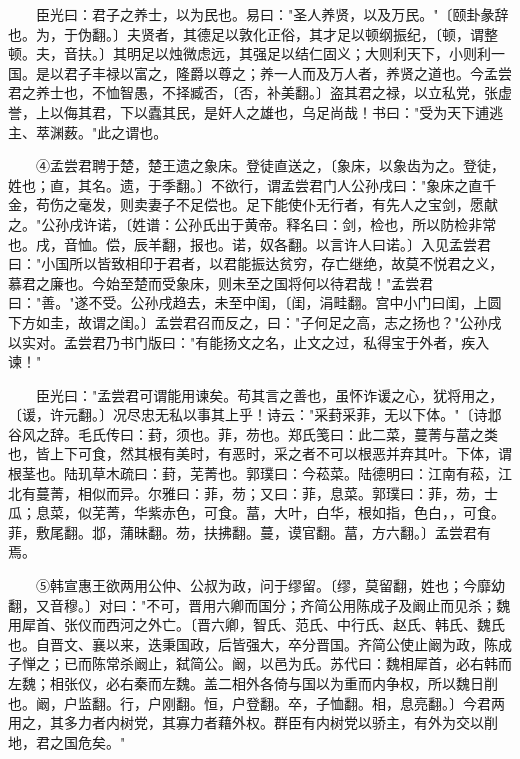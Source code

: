 　　臣光曰：君子之养士，以为民也。易曰："圣人养贤，以及万民。"〔颐卦彖辞也。为，于伪翻。〕夫贤者，其德足以敦化正俗，其才足以顿纲振纪，〔顿，谓整顿。夫，音扶。〕其明足以烛微虑远，其强足以结仁固义；大则利天下，小则利一国。是以君子丰禄以富之，隆爵以尊之；养一人而及万人者，养贤之道也。今孟尝君之养士也，不恤智愚，不择臧否，〔否，补美翻。〕盗其君之禄，以立私党，张虚誉，上以侮其君，下以蠹其民，是奸人之雄也，乌足尚哉！书曰："受为天下逋逃主、萃渊薮。"此之谓也。

　　④孟尝君聘于楚，楚王遗之象床。登徒直送之，〔象床，以象齿为之。登徒，姓也；直，其名。遗，于季翻。〕不欲行，谓孟尝君门人公孙戌曰："象床之直千金，苟伤之毫发，则卖妻子不足偿也。足下能使仆无行者，有先人之宝剑，愿献之。"公孙戌许诺，〔姓谱：公孙氏出于黄帝。释名曰：剑，检也，所以防检非常也。戌，音恤。偿，辰羊翻，报也。诺，奴各翻。以言许人曰诺。〕入见孟尝君曰："小国所以皆致相印于君者，以君能振达贫穷，存亡继绝，故莫不悦君之义，慕君之廉也。今始至楚而受象床，则未至之国将何以待君哉！"孟尝君曰："善。"遂不受。公孙戌趋去，未至中闺，〔闺，涓畦翻。宫中小门曰闺，上圆下方如圭，故谓之闺。〕孟尝君召而反之，曰："子何足之高，志之扬也？"公孙戌以实对。孟尝君乃书门版曰："有能扬文之名，止文之过，私得宝于外者，疾入谏！"

　　臣光曰："孟尝君可谓能用谏矣。苟其言之善也，虽怀诈谖之心，犹将用之，〔谖，许元翻。〕况尽忠无私以事其上乎！诗云："采葑采菲，无以下体。"〔诗邶谷风之辞。毛氏传曰：葑，须也。菲，芴也。郑氏笺曰：此二菜，蔓菁与葍之类也，皆上下可食，然其根有美时，有恶时，采之者不可以根恶并弃其叶。下体，谓根茎也。陆玑草木疏曰：葑，芜菁也。郭璞曰：今菘菜。陆德明曰：江南有菘，江北有蔓菁，相似而异。尔雅曰：菲，芴；又曰：菲，息菜。郭璞曰：菲，芴，士瓜；息菜，似芜菁，华紫赤色，可食。葍，大叶，白华，根如指，色白，，可食。菲，敷尾翻。邶，蒲昧翻。芴，扶拂翻。蔓，谟官翻。葍，方六翻。〕孟尝君有焉。

　　⑤韩宣惠王欲两用公仲、公叔为政，问于缪留。〔缪，莫留翻，姓也；今靡幼翻，又音穆。〕对曰："不可，晋用六卿而国分；齐简公用陈成子及阚止而见杀；魏用犀首、张仪而西河之外亡。〔晋六卿，智氏、范氏、中行氏、赵氏、韩氏、魏氏也。自晋文、襄以来，迭秉国政，后皆强大，卒分晋国。齐简公使止阚为政，陈成子惮之；已而陈常杀阚止，弑简公。阚，以邑为氏。苏代曰：魏相犀首，必右韩而左魏；相张仪，必右秦而左魏。盖二相外各倚与国以为重而内争权，所以魏日削也。阚，户监翻。行，户刚翻。恒，户登翻。卒，子恤翻。相，息亮翻。〕今君两用之，其多力者内树党，其寡力者藉外权。群臣有内树党以骄主，有外为交以削地，君之国危矣。"